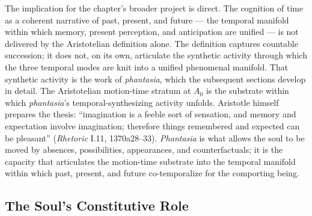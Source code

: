 The implication for the chapter's broader project is direct. The cognition of time as a coherent narrative of past, present, and future --- the temporal manifold within which memory, present perception, and anticipation are unified --- is not delivered by the Aristotelian definition alone. The definition captures countable succession; it does not, on its own, articulate the synthetic activity through which the three temporal modes are knit into a unified phenomenal manifold. That synthetic activity is the work of \textit{phantasia}, which the subsequent sections develop in detail. The Aristotelian motion-time stratum at $A_0$ is the substrate within which \textit{phantasia}'s temporal-synthesizing activity unfolds. Aristotle himself prepares the thesis: ``imagination is a feeble sort of sensation, and memory and expectation involve imagination; therefore things remembered and expected can be pleasant'' (\textit{Rhetoric} I.11, 1370a28--33). \textit{Phantasia} is what allows the soul to be moved by absences, possibilities, appearances, and counterfactuals; it is the capacity that articulates the motion-time substrate into the temporal manifold within which past, present, and future co-temporalize for the comporting being.

\subsection{The Soul's Constitutive Role}

